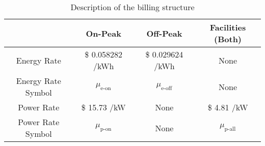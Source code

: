 \begin{table*}
\centering
\caption{Description of the billing structure}
\begin{tabular}{c | c c c}
		                   & On-Peak                & Off-Peak               & Facilities (Both)\\ \hline
		Energy Rate        & \$ 0.058282  /kWh & \$ 0.029624 /kWh  & None \\
		Energy Rate Symbol & $\mu_{\text{e-on}}$    & $\mu_{\text{e-off}}$   & None \\ \hline
		Power Rate  & \$ 15.73 /kW           & None                   & \$ 4.81 /kW \\
		Power Rate Symbol  & $\mu_{\text{p-on}}$    & None            & $\mu_{\text{p-all}}$
	\end{tabular}
	\label{tab:charges} 
\end{table*}

